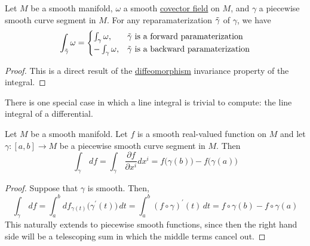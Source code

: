 \documentclass{article}
\newcounter{theorem}[section]
\begin{document}
    \begin{theorem}
      \label{thm:reparameterization-invariance-of-the-line}
    Let $M$ be a smooth manifold, $\omega$ a smooth \hyperref[def:covector-field]{covector field} on $M$, and $\gamma$ a piecewise smooth curve segment in $M$. For any reparamaterization $\Tilde{\gamma}$ of $\gamma$, we have
    \begin{equation}
      \int_{\Tilde{\gamma}} \omega = \begin{cases}
                \int_\gamma \omega, & \Tilde{\gamma} \text{ is a forward paramaterization} \\
                - \int_\gamma \omega, & \Tilde{\gamma} \text{ is a backward paramaterization}
          \end{cases}
    \end{equation}
    \end{theorem}
    \begin{proof}
    This is a direct result of the \hyperref[def:diffeomorphism-2]{diffeomorphism} invariance property of the integral. 
    \end{proof}

    There is one special case in which a line integral is trivial to compute: the line integral of a differential. 

    \begin{theorem}
      \label{thm:fundamental-theorem-of-line-integrals}
    Let $M$ be a smooth manifold. Let $f$ is a smooth real-valued function on $M$ and let $\gamma: [a,b] \to M$ be a piecewise smooth curve segment in $M$. Then 
    \begin{equation}
      \int_\gamma \,df = \int_\gamma \, \frac{\partial f}{\partial x^i} dx^i = f\big(\gamma(b)\big) - f\big(\gamma(a)\big)
    \end{equation}
    \end{theorem}
    \begin{proof}
    Suppose that $\gamma$ is smooth. Then, 
    \begin{equation}
      \int_\gamma\,df = \int_a^b df_{\gamma(t)} \big( \gamma^\prime (t) \big) \,dt = \int_a^b (f \circ \gamma)^\prime (t) \,dt = f \circ \gamma (b) - f \circ \gamma (a)
    \end{equation}
    This naturally extends to piecewise smooth functions, since then the right hand side will be a telescoping sum in which the middle terms cancel out. 
    \end{proof}
\end{document}
